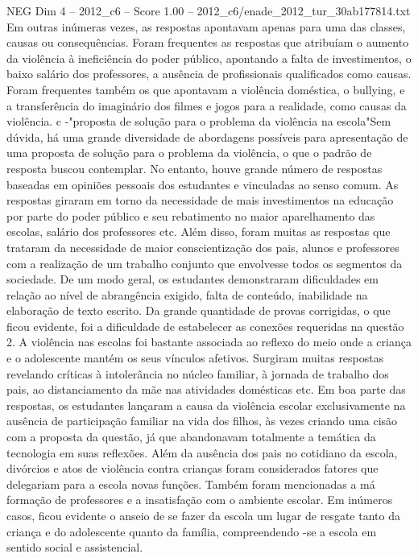 \begin{textsample}{NEG Dim 4 – 2012\_c6 – Score 1.00 – 2012\_c6/enade\_2012\_tur\_30ab177814.txt}
Em outras inúmeras vezes, as respostas apontavam apenas para uma das classes, causas ou consequências.
Foram frequentes as respostas que atribuíam o aumento da violência à ineficiência do poder público, apontando a falta de investimentos, o baixo salário dos professores, a ausência de profissionais qualificados como causas.
Foram frequentes também os que apontavam a violência doméstica, o bullying, e a transferência do imaginário dos filmes e jogos para a realidade, como causas da violência. c -"proposta de solução para o problema da violência na escola"Sem dúvida, há uma grande diversidade de abordagens possíveis para apresentação de uma proposta de solução para o problema da violência, o que o padrão de resposta buscou contemplar.
No entanto, houve grande número de respostas baseadas em opiniões pessoais dos estudantes e vinculadas ao senso comum.
As respostas giraram em torno da necessidade de mais investimentos na educação por parte do poder público e seu rebatimento no maior aparelhamento das escolas, salário dos professores etc.
Além disso, foram muitas as respostas que trataram da necessidade de maior conscientização dos pais, alunos e professores com a realização de um trabalho conjunto que envolvesse todos os segmentos da sociedade.
De um modo geral, os estudantes demonstraram dificuldades em relação ao nível de abrangência exigido, falta de conteúdo, inabilidade na elaboração de texto escrito.
Da grande quantidade de provas corrigidas, o que ficou evidente, foi a dificuldade de estabelecer as conexões requeridas na questão 2.
A violência nas escolas foi bastante associada ao reflexo do meio onde a criança e o adolescente mantém os seus vínculos afetivos.
Surgiram muitas respostas revelando críticas à intolerância no núcleo familiar, à jornada de trabalho dos pais, ao distanciamento da mãe nas atividades domésticas etc.
Em boa parte das respostas, os estudantes lançaram a causa da violência escolar exclusivamente na ausência de participação familiar na vida dos filhos, às vezes criando uma cisão com a proposta da questão, já que abandonavam totalmente a temática da tecnologia em suas reflexões.
Além da ausência dos pais no cotidiano da escola, divórcios e atos de violência contra crianças foram considerados fatores que delegariam para a escola novas funções.
Também foram mencionadas a má formação de professores e a insatisfação com o ambiente escolar.
Em inúmeros casos, ficou evidente o anseio de se fazer da escola um lugar de resgate tanto da criança e do adolescente quanto da família, compreendendo -se a escola em sentido social e assistencial.

\end{textsample}

